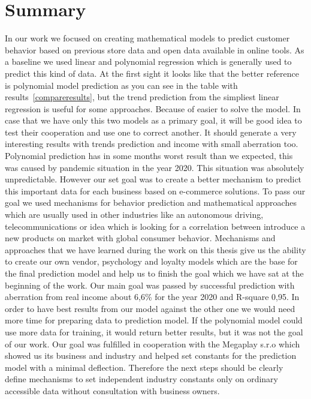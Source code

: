 
\chapter{Summary} \label{summary}
In our work we focused on creating mathematical models to predict customer behavior based on previous store data and open data available in online tools.
As a baseline we used linear and polynomial regression which is generally used to predict this kind of data.
At the first sight it looks like that the better reference is polynomial model prediction as you can see in the table with results~\ref{compareresults},
but the trend prediction from the simpliest linear regression is useful for some approaches.
Because of easier to solve the model.
In case that we have only this two models as a primary goal, it will be good idea to test their cooperation and use one to correct another.
It should generate a very interesting results with trends prediction and income with small aberration too.
Polynomial prediction has in some months worst result than we expected, this was caused by pandemic situation in the year 2020.
This situation was absolutely unpredictable.
However our set goal was to create a better mechanism to predict this important data for each business based on e-commerce solutions.
To pass our goal we used mechanisms for behavior prediction and mathematical approaches which are usually used in other industries like an autonomous driving,
telecommunications or idea which is looking for a correlation between introduce a new products on market with global consumer behavior.
Mechanisms and approaches that we have learned during the work on this thesis give us the ability to create our own vendor,
psychology and loyalty models which are the base for the final prediction model and help us to finish the goal which we have sat at the beginning of the work.
Our main goal was passed by successful prediction with aberration from real income about 6,6\% for the year 2020 and R-square 0,95.
In order to have best results from our model against the other one we would need more time for preparing data to prediction model.
If the polynomial model could use more data for training, it would return better results, but it was not the goal of our work.
Our goal was fulfilled in cooperation with the Megaplay s.r.o which showed us its business and industry and helped set constants for the prediction model with a minimal deflection.
Therefore the next steps should be clearly define mechanisms to set independent industry constants only on ordinary accessible data without consultation with business owners.
